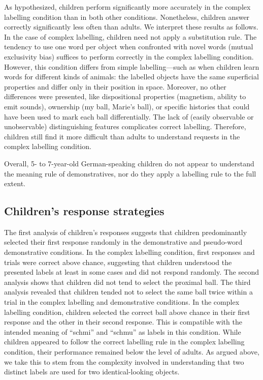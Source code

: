 \documentclass[
  man,floatsintext]{apa6}
\begin{document}
As hypothesized, children perform significantly more accurately in the complex labelling condition than in both other conditions. Nonetheless, children answer correctly significantly less often than adults. We interpret these results as follows. In the case of complex labelling, children need not apply a substitution rule. The tendency to use one word per object when confronted with novel words (mutual exclusivity bias) suffices to perform correctly in the complex labelling condition. However, this condition differs from simple labelling---such as when children learn words for different kinds of animals: the labelled objects have the same superficial properties and differ only in their position in space. Moreover, no other differences were presented, like dispositional properties (magnetism, ability to emit sounds), ownership (my ball, Marie's ball), or specific histories that could have been used to mark each ball differentially. The lack of (easily observable or unobservable) distinguishing features complicates correct labelling. Therefore, children still find it more difficult than adults to understand requests in the complex labelling condition.

Overall, 5- to 7-year-old German-speaking children do not appear to understand the meaning rule of demonstratives, nor do they apply a labelling rule to the full extent.

\subsection{Children's response strategies}\label{childrens-response-strategies}

The first analysis of children's responses suggests that children predominantly selected their first response randomly in the demonstrative and pseudo-word demonstrative conditions. In the complex labelling condition, first responses and trials were correct above chance, suggesting that children understood the presented labels at least in some cases and did not respond randomly. The second analysis shows that children did not tend to select the proximal ball. The third analysis revealed that children tended not to select the same ball twice within a trial in the complex labelling and demonstrative conditions. In the complex labelling condition, children selected the correct ball above chance in their first response and the other in their second response. This is compatible with the intended meaning of ``schmi'' and ``schmu'' as labels in this condition. While children appeared to follow the correct labelling rule in the complex labelling condition, their performance remained below the level of adults. As argued above, we take this to stem from the complexity involved in understanding that two distinct labels are used for two identical-looking objects.
\end{document}
